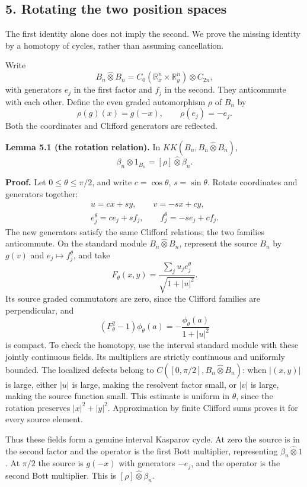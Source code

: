 \documentclass[
  11pt,
]{article}
\begin{document}
\subsection{5. Rotating the two position
spaces}\label{rotating-the-two-position-spaces}

The first identity alone does not imply the second. We prove the missing
identity by a homotopy of cycles, rather than assuming cancellation.

Write \[
B_n\widehat\otimes B_n
=C_0(\mathbb R_x^n\times\mathbb R_y^n)
\widehat\otimes C_{2n},
\] with generators \(e_j\) in the first factor and \(f_j\) in the
second. They anticommute with each other. Define the even graded
automorphism \(\rho\) of \(B_n\) by \[
\rho(g)(x)=g(-x),\qquad \rho(e_j)=-e_j.
\tag{5.1}
\] Both the coordinates and Clifford generators are reflected.

\textbf{Lemma 5.1 (the rotation relation).} In
\(KK(B_n,B_n\widehat\otimes B_n)\), \[
\beta_n\widehat\otimes1_{B_n}
=[\rho]\widehat\otimes\beta_n .
\tag{5.2}
\]

\textbf{Proof.} Let \(0\leq\theta\leq\pi/2\), and write
\(c=\cos\theta\), \(s=\sin\theta\). Rotate coordinates and generators
together: \[
\begin{gathered}
u=cx+sy,\qquad v=-sx+cy,\\
e_j^\theta=ce_j+sf_j,\qquad
f_j^\theta=-se_j+cf_j.
\end{gathered}
\tag{5.3}
\] The new generators satisfy the same Clifford relations; the two
families anticommute. On the standard module \(B_n\widehat\otimes B_n\),
represent the source \(B_n\) by \(g(v)\) and \(e_j\mapsto f_j^\theta\),
and take \[
F_\theta(x,y)=
\frac{\sum_ju_je_j^\theta}{\sqrt{1+|u|^2}}.
\tag{5.4}
\] Its source graded commutators are zero, since the Clifford families
are perpendicular, and \[
(F_\theta^2-1)\phi_\theta(a)
=-\frac{\phi_\theta(a)}{1+|u|^2}
\] is compact. To check the homotopy, use the interval standard module
with these jointly continuous fields. Its multipliers are strictly
continuous and uniformly bounded. The localized defects belong to
\(C([0,\pi/2],B_n\widehat\otimes B_n)\): when \(|(x,y)|\) is large,
either \(|u|\) is large, making the resolvent factor small, or \(|v|\)
is large, making the source function small. This estimate is uniform in
\(\theta\), since the rotation preserves \(|x|^2+|y|^2\). Approximation
by finite Clifford sums proves it for every source element.

Thus these fields form a genuine interval Kasparov cycle. At zero the
source is in the second factor and the operator is the first Bott
multiplier, representing \(\beta_n\widehat\otimes1\). At \(\pi/2\) the
source is \(g(-x)\) with generators \(-e_j\), and the operator is the
second Bott multiplier. This is \([\rho]\widehat\otimes\beta_n\).
\end{document}

